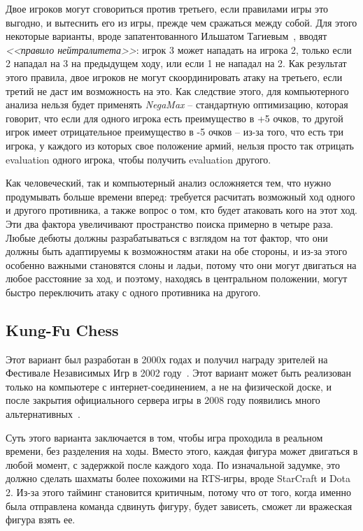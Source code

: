\documentclass{article}
\begin{document}
Двое игроков могут сговориться против третьего, если правилами игры это выгодно,
и вытеснить его из игры, прежде чем сражаться между собой.
Для этого некоторые варианты, вроде запатентованного Ильшатом Тагиевым~\cite{triad-chess},
вводят \emph{<<правило нейтралитета>>}:
игрок 3 может нападать на игрока 2, только если 2 нападал на 3 на предыдущем ходу,
или если 1 не нападал на 2. 
Как результат этого правила, двое игроков не могут скоординировать атаку на третьего,
если третий не даст им возможность на это. 
Как следствие этого, для компьютерного анализа нельзя будет применять \emph{NegaMax} --
стандартную оптимизацию, которая говорит, что если для одного игрока есть преимущество в +5 очков,
то другой игрок имеет отрицательное преимущество в -5 очков -- 
из-за того, что есть три игрока, у каждого из которых свое положение армий,
нельзя просто так отрицать evaluation одного игрока, 
чтобы получить evaluation другого.

Как человеческий, так и компьютерный анализ осложняется тем, что нужно продумывать больше времени вперед:
требуется расчитать возможный ход одного и другого противника, а также
вопрос о том, кто будет атаковать кого на этот ход. 
Эти два фактора увеличивают пространство поиска примерно в четыре раза. 
Любые дебюты должны разрабатываться с взглядом на тот фактор,
что они должны быть адаптируемы к возможностям атаки на обе стороны,
и из-за этого особенно важными становятся слоны и ладьи,
потому что они могут двигаться на любое расстояние за ход,
и поэтому, находясь в центральном положении,
могут быстро переключить атаку с одного противника на другого.


\subsection{Kung-Fu Chess}

Этот вариант был разработан в 2000х годах
и получил награду зрителей на Фестивале Независимых Игр в 2002 году~\cite{igf-kungfuchess}.
Этот вариант может быть реализован только на компьютере с интернет-соединением,
а не на физической доске,
и после закрытия официального сервера игры в 2008 году
появились много альтернативных~\cite{kfchess}.

Суть этого варианта заключается в том, 
чтобы игра проходила в реальном времени,
без разделения на ходы. 
Вместо этого, каждая фигура может двигаться в любой момент,
с задержкой после каждого хода.
По изначальной задумке, это должно сделать шахматы более похожими на
RTS-игры, вроде StarCraft и Dota 2.
Из-за этого тайминг становится критичным,
потому что от того, когда именно была отправлена команда сдвинуть фигуру,
будет зависеть, сможет ли вражеская фигура взять ее.
\end{document}
